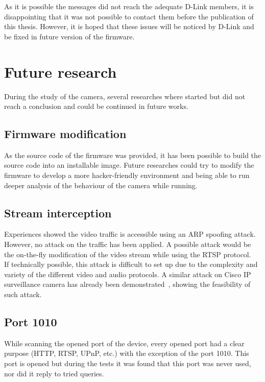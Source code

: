As it is possible the messages did not reach the adequate D-Link members, it is disappointing that it was not possible to contact them before the publication of this thesis.
However, it is hoped that these issues will be noticed by D-Link and be fixed in future version of the firmware.

\section{Future research}
\label{sec:dcs-future}

During the study of the camera, several researches where started but did not reach a conclusion and could be continued in future works.


\subsection{Firmware modification}

As the source code of the firmware was provided, it has been possible to build the source code into an installable image.
Future researches could try to modify the firmware to develop a more hacker-friendly environment and being able to run deeper analysis of the behaviour of the camera while running.

\subsection{Stream interception}

Experiences showed the video traffic is accessible using an ARP spoofing attack.
However, no attack on the traffic has been applied.
A possible attack would be the on-the-fly modification of the video stream while using the RTSP protocol.\\

If technically possible, this attack is difficult to set up due to the complexity and variety of the different video and audio protocols.
A similar attack on Cisco IP surveillance camera has already been demonstrated~\cite{ucsniff}, showing the feasibility of such attack.

\subsection{Port 1010}

While scanning the opened port of the device, every opened port had a clear purpose (HTTP, RTSP, UPnP, etc.) with the exception of the port 1010.
This port is opened but during the tests it was found that this port was never used, nor did it reply to tried queries.\\

